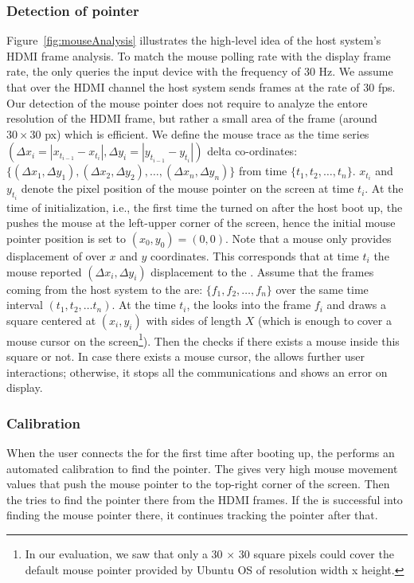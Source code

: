 \subsubsection{\bfseries Detection of pointer} Figure~\ref{fig:mouseAnalysis} illustrates the high-level idea of the host system's HDMI frame analysis. To match the mouse polling rate with the display frame rate, the \device only queries the input device with the frequency of $30$ Hz. We assume that over the HDMI channel the host system sends frames at the rate of $30$ fps. Our detection of the mouse pointer does not require to analyze the entore resolution of the HDMI frame, but rather a small area of the frame (around $30\times 30$ px) which is efficient. We define the mouse trace as the time series $(\Delta x_i = |x_{t_{i-1}} - x_{t_{i}}|, \Delta y_i=|y_{t_{i-1}} - y_{t_{i}}|)$ delta co-ordinates: $\{(\Delta x_1, \Delta y_1), (\Delta x_2, \Delta y_2), \ldots, (\Delta x_n, \Delta y_n)\}$ from time $\{t_1, t_2, \ldots, t_n\}$. $x_{t_{i}}$ and $y_{t_{i}}$ denote the pixel position of the mouse pointer on the screen at time $t_i$. At the time of initialization, i.e., the first time the \device turned on after the host boot up, the \device pushes the mouse at the left-upper corner of the screen, hence the initial mouse pointer position is set to $(x_0, y_0) = (0, 0)$.  
Note that a mouse only provides displacement of over $x$ and $y$ coordinates. This corresponds that at time $t_i$ the mouse reported $(\Delta x_i, \Delta y_i)$ displacement to the \device. Assume that the frames coming from the host system to the \device are: $\{f_1, f_2, \ldots, f_n\}$ over the same time interval $(t_1, t_2,\ldots t_n)$. At the time $t_i$, the \device looks into the frame $f_i$ and draws a square centered at $(x_i, y_i)$ with sides of length $X$ (which is enough to cover a mouse cursor on the screen\footnote{In our evaluation, we saw that only a 30 $\times$ 30 square pixels could cover the default mouse pointer provided by Ubuntu OS of resolution width x height.}). Then the \device checks if there exists a mouse inside this square or not. In case there exists a mouse cursor, the \device allows further user interactions; otherwise, it stops all the communications and shows an error on display.

\subsubsection{\bfseries Calibration} When the user connects the \device for the first time after booting up, the \device performs an automated calibration to find the pointer. The \device gives very high mouse movement values that push the mouse pointer to the top-right corner of the screen. Then the \device tries to find the pointer there from the HDMI frames. If the \device is successful into finding the mouse pointer there, it continues tracking the pointer after that.  

